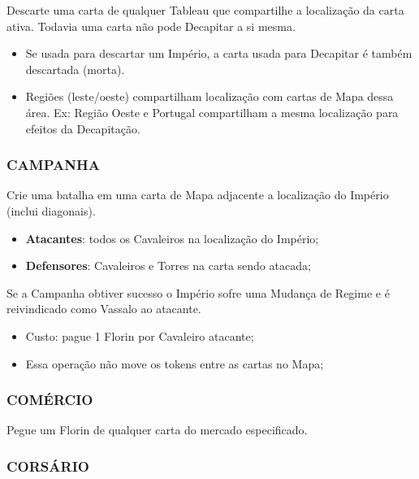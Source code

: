 \documentclass[11pt]{article}
\begin{document}
Descarte uma carta de qualquer Tableau que compartilhe a localização da carta ativa. Todavia uma carta não pode Decapitar a si mesma.

\begin{itemize}
\item Se usada para descartar um Império, a carta usada para Decapitar é também descartada (morta).

\item Regiões (leste/oeste) compartilham localização com cartas de Mapa dessa área. Ex: Região Oeste e Portugal compartilham a mesma localização para efeitos da Decapitação.
\end{itemize}

\subsubsection{CAMPANHA}
\label{sec:org2dffccc}

Crie uma batalha em uma carta de Mapa adjacente a localização do Império (inclui diagonais).

\begin{itemize}
\item \textbf{Atacantes}: todos os Cavaleiros na localização do Império;

\item \textbf{Defensores}: Cavaleiros e Torres na carta sendo atacada;
\end{itemize}

Se a Campanha obtiver sucesso o Império sofre uma Mudança de Regime e é reivindicado como Vassalo ao atacante.

\begin{itemize}
\item Custo: pague 1 Florin por Cavaleiro atacante;

\item Essa operação não move os tokens entre as cartas no Mapa;
\end{itemize}

\subsubsection{COMÉRCIO}
\label{sec:org5503438}

Pegue um Florin de qualquer carta do mercado especificado.

\subsubsection{CORSÁRIO}
\label{sec:org74ba9e0}
\end{document}
